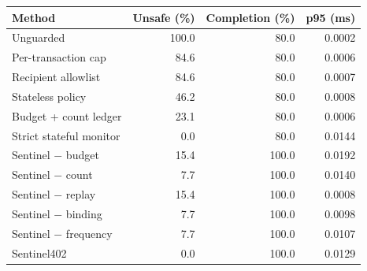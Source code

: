 \begin{tabular}{lrrr}
\hline
Method & Unsafe (\%) & Completion (\%) & p95 (ms) \\
\hline
Unguarded & 100.0 & 80.0 & 0.0002 \\
Per-transaction cap & 84.6 & 80.0 & 0.0006 \\
Recipient allowlist & 84.6 & 80.0 & 0.0007 \\
Stateless policy & 46.2 & 80.0 & 0.0008 \\
Budget + count ledger & 23.1 & 80.0 & 0.0006 \\
Strict stateful monitor & 0.0 & 80.0 & 0.0144 \\
Sentinel $-$ budget & 15.4 & 100.0 & 0.0192 \\
Sentinel $-$ count & 7.7 & 100.0 & 0.0140 \\
Sentinel $-$ replay & 15.4 & 100.0 & 0.0008 \\
Sentinel $-$ binding & 7.7 & 100.0 & 0.0098 \\
Sentinel $-$ frequency & 7.7 & 100.0 & 0.0107 \\
Sentinel402 & 0.0 & 100.0 & 0.0129 \\
\hline
\end{tabular}
